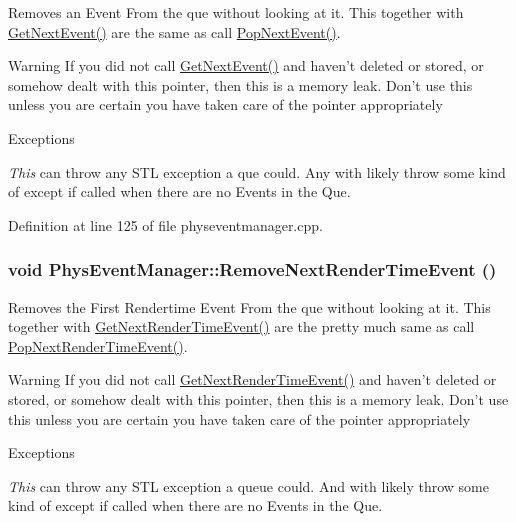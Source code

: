 Removes an Event From the que without looking at it. This together with \hyperlink{classPhysEventManager_a6de94bc6c23dcbd7e15785cadee2e80b}{GetNextEvent()} are the same as call \hyperlink{classPhysEventManager_a3122b32172326ac32cfecc828b820977}{PopNextEvent()}. \begin{DoxyWarning}{Warning}
If you did not call \hyperlink{classPhysEventManager_a6de94bc6c23dcbd7e15785cadee2e80b}{GetNextEvent()} and haven't deleted or stored, or somehow dealt with this pointer, then this is a memory leak. Don't use this unless you are certain you have taken care of the pointer appropriately 
\end{DoxyWarning}

\begin{DoxyExceptions}{Exceptions}
\item[{\em This}]can throw any STL exception a que could. Any with likely throw some kind of except if called when there are no Events in the Que. \end{DoxyExceptions}


Definition at line 125 of file physeventmanager.cpp.\hypertarget{classPhysEventManager_a56acc075e743921e27284c023b3298ce}{
\subsubsection[{RemoveNextRenderTimeEvent}]{\setlength{\rightskip}{0pt plus 5cm}void PhysEventManager::RemoveNextRenderTimeEvent ()}}
\label{d5/dd7/classPhysEventManager_a56acc075e743921e27284c023b3298ce}


Removes the First Rendertime Event From the que without looking at it. This together with \hyperlink{classPhysEventManager_a1f2d0506ce816176913e5bdfaa9fd724}{GetNextRenderTimeEvent()} are the pretty much same as call \hyperlink{classPhysEventManager_ad627925363fdbcff98e0faef204e81e2}{PopNextRenderTimeEvent()}. \begin{DoxyWarning}{Warning}
If you did not call \hyperlink{classPhysEventManager_a1f2d0506ce816176913e5bdfaa9fd724}{GetNextRenderTimeEvent()} and haven't deleted or stored, or somehow dealt with this pointer, then this is a memory leak. Don't use this unless you are certain you have taken care of the pointer appropriately 
\end{DoxyWarning}

\begin{DoxyExceptions}{Exceptions}
\item[{\em This}]can throw any STL exception a queue could. And with likely throw some kind of except if called when there are no Events in the Que. \end{DoxyExceptions}


